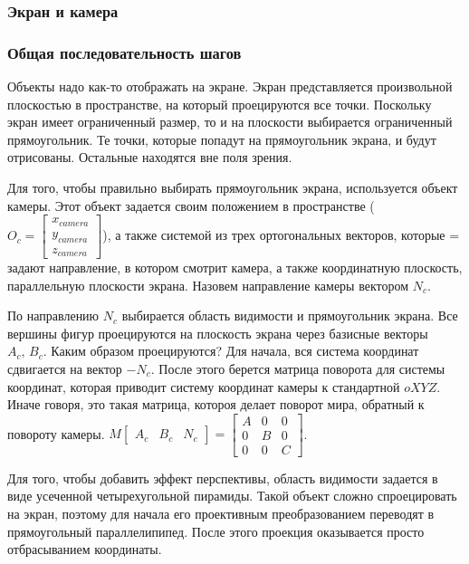 \documentclass{article}
\begin{document}
\subsubsection{Экран и камера}

\subsubsection{Общая последовательность шагов}

Объекты надо как-то отображать на экране. Экран представляется произвольной плоскостью в пространстве, на который проецируются все точки. Поскольку экран имеет ограниченный размер, то и на плоскости выбирается ограниченный прямоугольник. Те точки, которые попадут на прямоугольник экрана, и будут отрисованы. Остальные находятся вне поля зрения.

Для того, чтобы правильно выбирать прямоугольник экрана, используется объект камеры. Этот объект задается своим положением в пространстве ($O_c =  \begin{bmatrix} x_{camera} \\ y_{camera} \\ z_{camera} \end{bmatrix}$), а также системой из трех ортогональных векторов, которые = задают направление, в котором смотрит камера, а также координатную плоскость, параллельную плоскости экрана. Назовем направление камеры вектором $N_c$.

По направлению $N_c$ выбирается область видимости и прямоугольник экрана. Все вершины фигур проецируются на плоскость экрана через базисные векторы $A_c,\,B_c$. Каким образом проецируются? Для начала, вся система координат сдвигается на вектор $-N_c$. После этого берется матрица поворота для системы координат, которая приводит систему координат камеры к стандартной $oXYZ$. Иначе говоря, это такая матрица, котороя делает поворот мира, обратный к повороту камеры. $M \begin{bmatrix}A_c& B_c& N_c\end{bmatrix} = \begin{bmatrix} A & 0 & 0 \\ 0 & B & 0 \\ 0 & 0 & C \end{bmatrix}$.

Для того, чтобы добавить эффект перспективы, область видимости задается в виде усеченной четырехугольной пирамиды. Такой объект сложно спроецировать на экран, поэтому для начала его проективным преобразованием переводят в прямоугольный параллелипипед. После этого проекция оказывается просто отбрасыванием координаты.
\end{document}
